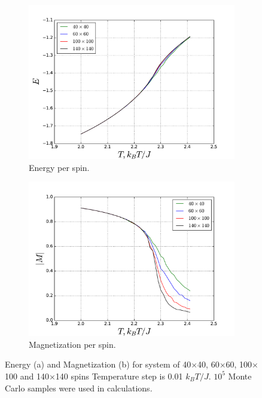 \documentclass[10pt]{article}
\begin{document}
\begin{figure}
\centering
   \begin{subfigure}[b]{1\textwidth}
   \includegraphics[width=0.9\linewidth]{phase_10_5_energy}
   \caption{Energy per spin.}
   \label{fig:phase_energy} 
\end{subfigure}

\begin{subfigure}[b]{1\textwidth}
   \includegraphics[width=0.9\linewidth]{phase_10_5_magnetization}
   \caption{Magnetization per spin.}
   \label{fig:phase_magnetiz}
\end{subfigure}
\caption{Energy (a) and Magnetization (b) for system of 40$\times$40, 60$\times$60, 100$\times$100 and 140$\times$140 spins
Temperature step is 0.01 $k_BT/J$. $10^5$ Monte Carlo samples were used in calculations.}
\end{figure}
\clearpage
\end{document}
